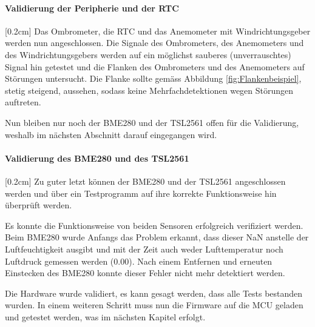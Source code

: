 \paragraph{\textbf{Validierung der Peripherie und der RTC}}[0.2cm]
Das Ombrometer, die RTC und das Anemometer mit Windrichtungsgeber werden nun angeschlossen. Die Signale des Ombrometers, des Anemometers und des Windrichtungsgebers werden auf ein möglichst sauberes (unverrauschtes) Signal hin getestet und die Flanken des Ombrometers und des Anemometers auf Störungen untersucht. Die Flanke sollte gemäss Abbildung \ref{fig:Flankenbeispiel}, stetig steigend, aussehen, sodass keine Mehrfachdetektionen wegen Störungen auftreten.


Nun bleiben nur noch der BME280 und der TSL2561 offen für die Validierung, weshalb im nächsten Abschnitt darauf eingegangen wird.

\paragraph{\textbf{Validierung des BME280 und des TSL2561}}[0.2cm]
Zu guter letzt können der BME280 und der TSL2561 angeschlossen werden und über ein Testprogramm auf ihre korrekte Funktionsweise hin überprüft werden.

Es konnte die Funktionsweise von beiden Sensoren erfolgreich verifiziert werden. Beim BME280 wurde Anfangs das Problem erkannt, dass dieser NaN anstelle der Luftfeuchtigkeit ausgibt und mit der Zeit auch weder Lufttemperatur noch Luftdruck gemessen werden (0.00). Nach einem Entfernen und erneuten Einstecken des BME280 konnte dieser Fehler nicht mehr detektiert werden.


Die Hardware wurde validiert, es kann gesagt werden, dass alle Tests bestanden wurden. In einem weiteren Schritt muss nun die Firmware auf die MCU geladen und getestet werden, was im nächsten Kapitel erfolgt.